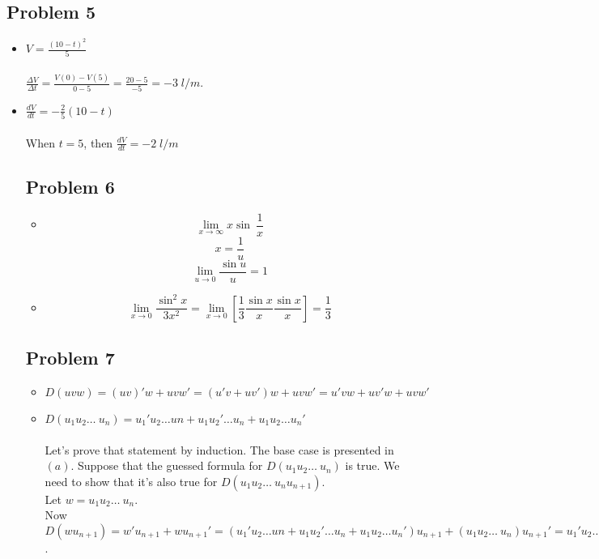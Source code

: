\documentclass{article}
\begin{document}
\subsection{Problem 5}
\begin{itemize}
\item[a)] 
$V = \frac{(10-t)^2}{5}$ \\ \\ 
$\frac{\Delta V}{\Delta t} = \frac{V(0) - V(5)}{0 - 5} = \frac{20 - 5}{-5} = -3\; l/m$.

\item[b)]
$\frac{dV}{dt} = -\frac{2}{5}(10-t)$ \\ \\
When $t = 5$, then $\frac{dV}{dt} = -2\; l/m$

\subsection{Problem 6}

\begin{itemize}
\item[(19d)] 
\[\lim_{x\to \infty}x\sin\ \frac{1}{x}\]
\[x = \frac{1}{u}\]
\[\lim_{u\to 0}\frac{\sin u}{u} = 1\]

\item[(19f)]
\[\lim_{x \to 0}\frac{\sin^2 x}{3x^2} = \lim_{x \to 0}\left[ \frac{1}{3}\frac{\sin x}{x}\frac{\sin x}{x} \right] = \frac{1}{3}\]
\end{itemize}

\subsection{Problem 7}
\begin{itemize}
\item[a)] 
$D(uvw) = (uv)'w + uvw' = (u'v + uv')w + uvw' = u'vw + uv'w + uvw'$
\item[b)]
$D(u_1u_2 \dots\ u_n) = u_1'u_2 \dots un + u_1u_2' \dots u_n + u_1u_2 \dots u_n'$ \\ \\
Let's prove that statement by induction. The base case is presented in $(a)$. Suppose that the guessed formula for $D(u_1u_2 \dots\ u_n)$ is true. We need to show that it's also true for $D(u_1u_2 \dots\ u_nu_{n+1})$. \\
Let $w = u_1u_2 \dots\ u_n$. \\
Now $D(wu_{n+1}) = w'u_{n+1} + wu_{n+1}' = (u_1'u_2 \dots un + u_1u_2' \dots u_n + u_1u_2 \dots u_n')u_{n+1} + (u_1u_2 \dots\ u_n)u_{n+1}' = u_1'u_2 \dots unu_{n+1} + u_1u_2' \dots u_nu_{n+1} + u_1u_2 \dots u_n'u_{n+1} + u_1u_2 \dots\ u_nu_{n+1}'$.
\end{itemize}

\end{itemize}
\end{document}
